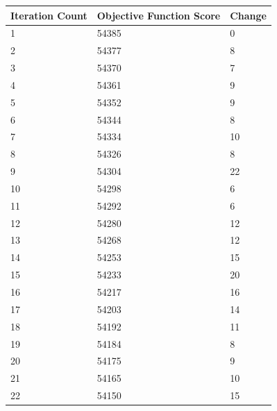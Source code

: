 \documentclass{article}
\begin{document}
\begin{figure}[H]
	\centering
	\begin{tabular}{|l|l|l|} 
		\hline
		Iteration Count & Objective Function Score & Change  \\ 
		\hline
		1               & 54385                    & 0       \\ 
		\hline
		2               & 54377                    & 8       \\ 
		\hline
		3               & 54370                    & 7       \\ 
		\hline
		4               & 54361                    & 9       \\ 
		\hline
		5               & 54352                    & 9       \\ 
		\hline
		6               & 54344                    & 8       \\ 
		\hline
		7               & 54334                    & 10      \\ 
		\hline
		8               & 54326                    & 8       \\ 
		\hline
		9               & 54304                    & 22      \\ 
		\hline
		10              & 54298                    & 6       \\ 
		\hline
		11              & 54292                    & 6       \\ 
		\hline
		12              & 54280                    & 12      \\ 
		\hline
		13              & 54268                    & 12      \\ 
		\hline
		14              & 54253                    & 15      \\ 
		\hline
		15              & 54233                    & 20      \\ 
		\hline
		16              & 54217                    & 16      \\ 
		\hline
		17              & 54203                    & 14      \\ 
		\hline
		18              & 54192                    & 11      \\ 
		\hline
		19              & 54184                    & 8       \\ 
		\hline
		20              & 54175                    & 9       \\ 
		\hline
		21              & 54165                    & 10      \\ 
		\hline
		22              & 54150                    & 15      \\ 

\end{tabular}
\end{figure}
\end{document}
